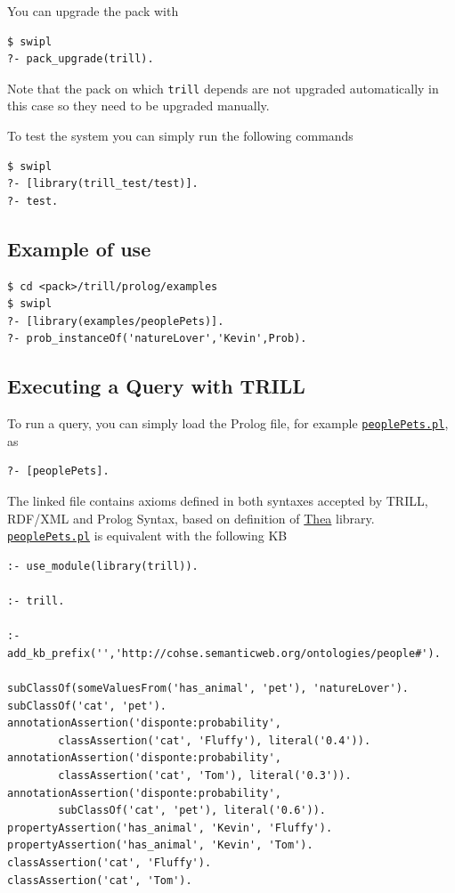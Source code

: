\documentclass[a4paper,10pt]{scrartcl}
\begin{document}
You can upgrade the pack with
\begin{verbatim}
$ swipl
?- pack_upgrade(trill).
\end{verbatim}
Note that the pack on which \verb|trill| depends are not upgraded automatically in this case so they need to be upgraded manually.

To test the system you can simply run the following commands
\begin{verbatim}
$ swipl
?- [library(trill_test/test)].
?- test.
\end{verbatim}

\subsection{Example of use}
\begin{verbatim}
$ cd <pack>/trill/prolog/examples
$ swipl
?- [library(examples/peoplePets)].
?- prob_instanceOf('natureLover','Kevin',Prob).
\end{verbatim}
	





\subsection{Executing a Query with TRILL}
\label{sec:trillq}
To run a query, you can simply load the Prolog file, for example \href{http://trill.lamping.unife.it/example/trill/peoplePets.pl}{\texttt{peoplePets.pl}}, as
\begin{verbatim}
?- [peoplePets].
\end{verbatim}
\noindent
The linked file contains axioms defined in both syntaxes accepted by TRILL, RDF/XML and Prolog Syntax, based on definition of \href{http://vangelisv.github.io/thea/}{Thea} library.
\href{http://trill.lamping.unife.it/example/trill/peoplePets.pl}{\texttt{peoplePets.pl}} is equivalent with the following KB
\begin{verbatim}
:- use_module(library(trill)).

:- trill.

:- add_kb_prefix('','http://cohse.semanticweb.org/ontologies/people#').

subClassOf(someValuesFrom('has_animal', 'pet'), 'natureLover').
subClassOf('cat', 'pet').
annotationAssertion('disponte:probability', 
        classAssertion('cat', 'Fluffy'), literal('0.4')).
annotationAssertion('disponte:probability', 
        classAssertion('cat', 'Tom'), literal('0.3')).
annotationAssertion('disponte:probability', 
        subClassOf('cat', 'pet'), literal('0.6')).
propertyAssertion('has_animal', 'Kevin', 'Fluffy').
propertyAssertion('has_animal', 'Kevin', 'Tom').
classAssertion('cat', 'Fluffy').
classAssertion('cat', 'Tom').
\end{verbatim}
\noindent
\end{document}
